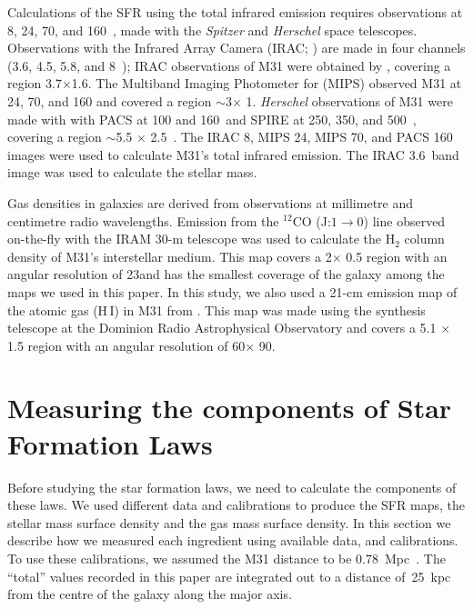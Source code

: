 Calculations of the SFR using the total infrared emission requires observations at 8, 24, 70, and 160~\um, made
with the {\em Spitzer} \citep{Werner04} and {\em Herschel} \citep{Pilbratt10}  space telescopes. 
Observations with the Infrared Array Camera (IRAC; \citep{Fazio04}) are made in four channels (3.6, 4.5, 5.8, and 8~\um); IRAC observations of M31 were obtained by \citet{Barmby06}, covering a region 3\degr.7$\times $1\degr.6. 
The Multiband Imaging Photometer for \Spitzer (MIPS) observed M31 at 24, 70, and 160 \um and covered a region $\sim 3$\degr $\times$ 1\degr \citep{Gordon06}. {\em Herschel} observations of M31 were made with with PACS \citep[Photodetector Array Camera and Spectrometer;][]{Poglitsch10}  at 100 and 160~\um and SPIRE  \citep[Spectral and Photometric Imaging Receiver;][]{Griffin10} 
at 250, 350, and 500~\um, covering a region  $\sim$5\degr.5 $\times$ 2\degr.5~\citep{Fritz12}.
The IRAC 8, MIPS 24, MIPS 70, and PACS 160 images were used to calculate M31's total infrared emission. 
The IRAC 3.6~\um band image was used to calculate the stellar mass. 

Gas densities in galaxies are derived from observations at millimetre and centimetre radio wavelengths.
Emission from the $^{12}$CO (J:$1\rightarrow0$) line observed on-the-fly with the IRAM 30-m telescope \citep{Nieten06} was used to calculate the H$_2$ column density of M31's interstellar medium. This map covers a 2\degr $\times$ 0\degr.5 region with an angular resolution of 23\arcsec and has the smallest coverage of the galaxy among the maps we used in this paper. In this study, we also used a 21-cm emission map of the atomic gas (H\,{\sc I}) in M31 from \citet{Chemin09}. This map was made using the synthesis telescope at the Dominion Radio Astrophysical Observatory and covers a 5\degr.1 $\times$ 1\degr.5 region with an angular resolution of 60\arcsec $\times$ 90\arcsec.


\section{Measuring the components of Star Formation Laws}
Before studying the star formation laws, we need to calculate the components of these laws. We used different data and calibrations to produce the SFR maps, the stellar mass surface density and the gas mass surface density. In this section we describe how we measured each ingredient using available data, and calibrations. To use these calibrations, we assumed the M31 distance to be 0.78~Mpc~\citep{McConnachie05}. The ``total'' values recorded in this paper are integrated out to a distance of~25~kpc from the centre of the galaxy along the major axis. 

